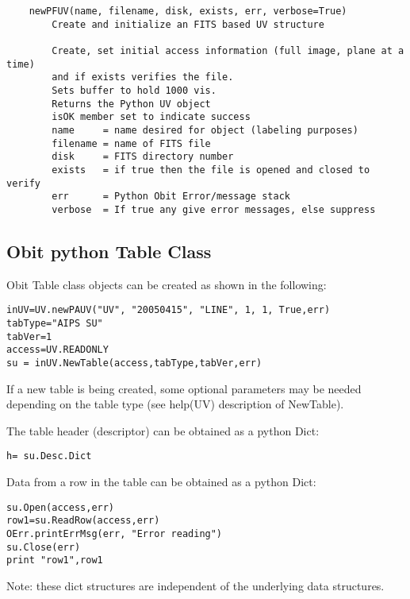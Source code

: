 \documentclass[11pt]{report}
\begin{document}
\begin{verbatim}
    newPFUV(name, filename, disk, exists, err, verbose=True)
        Create and initialize an FITS based UV structure
        
        Create, set initial access information (full image, plane at a time)
        and if exists verifies the file.
        Sets buffer to hold 1000 vis.
        Returns the Python UV object
        isOK member set to indicate success
        name     = name desired for object (labeling purposes)
        filename = name of FITS file
        disk     = FITS directory number
        exists   = if true then the file is opened and closed to verify
        err      = Python Obit Error/message stack
        verbose  = If true any give error messages, else suppress

\end{verbatim}

\subsection{Obit python Table Class}
Obit Table class objects can be created as shown in the following:
\begin{verbatim}
inUV=UV.newPAUV("UV", "20050415", "LINE", 1, 1, True,err)
tabType="AIPS SU"
tabVer=1
access=UV.READONLY
su = inUV.NewTable(access,tabType,tabVer,err)
\end{verbatim}
If a new table is being created, some optional parameters may be needed
depending on the table type (see help(UV) description of NewTable).

The table header (descriptor) can be obtained as a python Dict:
\begin{verbatim}
h= su.Desc.Dict
\end{verbatim}

Data from a row in the table can be obtained as a python Dict:
\begin{verbatim}
su.Open(access,err)
row1=su.ReadRow(access,err)
OErr.printErrMsg(err, "Error reading")
su.Close(err)
print "row1",row1
\end{verbatim}

Note: these dict structures are independent of the underlying data structures.
\end{document}
